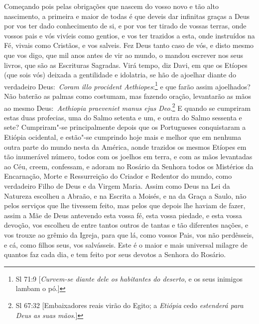 Começando pois pelas obrigações que nascem do vosso novo e
tão alto nascimento, a primeira e maior de todas é que deveis dar
infinitas graças a Deus por vos ter dado conhecimento de si, e por vos
ter tirado de vossas terras, onde vossos pais e vós vivíeis como
gentios, e vos ter trazidos a esta, onde instruídos na Fé, vivais como
Cristãos, e vos salveis. Fez Deus tanto caso de vós, e disto mesmo que
vos digo, que mil anos antes de vir ao mundo, o mandou escrever nos seus
livros, que são as Escrituras Sagradas. Virá tempo, diz Davi, em que os
Etíopes (que sois vós) deixada a gentilidade e idolatria, se hão de
ajoelhar diante do verdadeiro Deus:~\emph{Coram illo procident
Aethiopes}:\footnote{Sl 71:9 [\textit{Curvem-se diante dele os habitantes do deserto}, e os seus inimigos lambam o pó.]} e que farão assim ajoelhados? Não baterão
as palmas como costumam, mas fazendo oração, levantarão as mãos ao mesmo
Deus:~\emph{Aethiopia praeveniet manus ejus Deo}.\footnote{Sl 67:32 [Embaixadores reais virão do Egito; a \textit{Etiópia} cedo \textit{estenderá para Deus as suas mãos}.]} E
quando se cumpriram estas duas profecias, uma do Salmo setenta e um, e
outra do Salmo sessenta e sete? Cumpriram"-se principalmente depois que
os Portugueses conquistaram a Etiópia ocidental, e estão"-se cumprindo
hoje mais e melhor que em nenhuma outra parte do mundo nesta da América,
aonde trazidos os mesmos Etíopes em tão inumerável número, todos com os
joelhos em terra, e com as mãos levantadas ao Céu, creem, confessam, e
adoram no Rosário da Senhora todos os Mistérios da Encarnação, Morte e
Ressurreição do Criador e Redentor do mundo, como verdadeiro Filho de
Deus e da Virgem Maria. Assim como Deus na Lei da Natureza escolheu a
Abraão, e na Escrita a Moisés, e na da Graça a Saulo, não pelos serviços
que lhe tivessem feito, mas pelos que depois lhe haviam de fazer, assim
a Mãe de Deus antevendo esta vossa fé, esta vossa piedade, e esta vossa
devoção, vos escolheu de entre tantos outros de tantas e tão diferentes
nações, e vos trouxe ao grêmio da Igreja, para que lá, como vossos Pais,
vos não perdêsseis, e cá, como filhos seus, vos salvásseis. Este é o
maior e mais universal milagre de quantos faz cada dia, e tem feito por
seus devotos a Senhora do Rosário.


